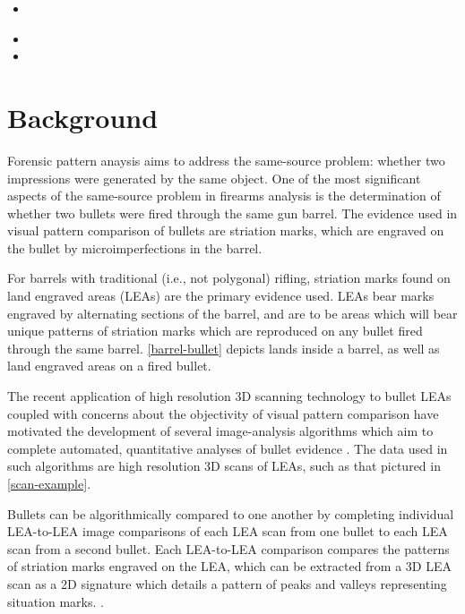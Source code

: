 \documentclass[12pt]{article}
\providecommand{\tightlist}{%
  \setlength{\itemsep}{0pt}\setlength{\parskip}{0pt}}
\begin{document}
\begin{itemize}
\tightlist
\item
  \\
\item
\item
\end{itemize}

\section{Background}

Forensic pattern anaysis aims to address the same-source problem:
whether two impressions were generated by the same object. One of the
most significant aspects of the same-source problem in firearms analysis
is the determination of whether two bullets were fired through the same
gun barrel. The evidence used in visual pattern comparison of bullets
are striation marks, which are engraved on the bullet by
microimperfections in the barrel.

For barrels with traditional (i.e., not polygonal) rifling, striation
marks found on land engraved areas (LEAs) are the primary evidence used.
LEAs bear marks engraved by alternating sections of the barrel, and are
 to be areas which will bear unique patterns of striation
marks which are reproduced on any bullet fired through the same
 barrel. \autoref{barrel-bullet} depicts lands inside a
barrel, as well as land engraved areas on a fired bullet.

The recent application of high resolution 3D scanning technology to
bullet LEAs coupled with concerns about the objectivity of visual
pattern comparison have motivated the development of several
image-analysis algorithms which aim to complete automated, quantitative
analyses of bullet evidence
\citep[see][]{DeKinder1, DeKinder2, Bachrach1, Ma1, Chu1, Chu2, Hare1}.
The data used in such algorithms are high resolution 3D scans of LEAs,
such as that pictured in \autoref{scan-example}.

Bullets can be algorithmically compared to one another by completing
individual LEA-to-LEA image comparisons of each LEA scan from one bullet
to each LEA scan from a second bullet. Each LEA-to-LEA comparison
compares the patterns of striation marks engraved on the LEA, which can
be extracted from a 3D LEA scan as a 2D signature which details a
pattern of peaks and valleys representing situation marks.
.
\end{document}

